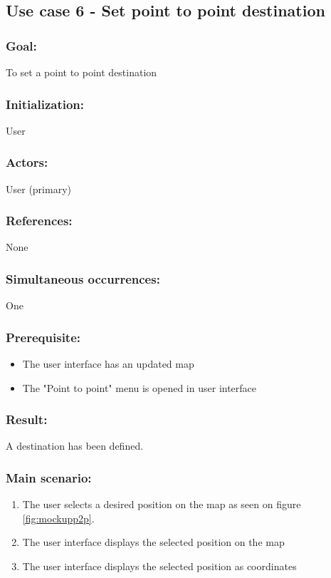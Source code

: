 \begin{framed}
	\subsection{Use case 6 - Set point to point destination}
	\subsubsection*{Goal:}
	To set a point to point destination
	
	\subsubsection*{Initialization:}
	User
	
	\subsubsection*{Actors:}
	User (primary)
	
	\subsubsection*{References:}
	None
	
	\subsubsection*{Simultaneous occurrences:}
	One
	
	\subsubsection*{Prerequisite:}
	\begin{itemize}
		\item The user interface has an updated map
		\item The "Point to point" menu is opened in user interface
	\end{itemize}
	
	\subsubsection*{Result:}
	A destination has been defined.
	
	\subsubsection*{Main scenario:}
	\begin{enumerate}
		\item The user selects a desired position on the map as seen on figure \ref{fig:mockupp2p}.
		\item \label{uc4.2} The user interface displays the selected position on the map
		\item The user interface displays the selected position as coordinates
	\end{enumerate}	
	

\end{framed}
